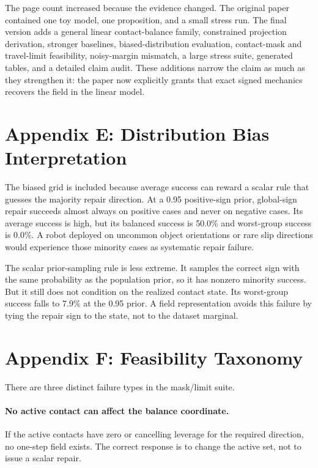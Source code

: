 \documentclass{article}
\begin{document}
The page count increased because the evidence changed. The original paper contained one toy model, one proposition, and a small stress run. The final version adds a general linear contact-balance family, constrained projection derivation, stronger baselines, biased-distribution evaluation, contact-mask and travel-limit feasibility, noisy-margin mismatch, a large stress suite, generated tables, and a detailed claim audit. These additions narrow the claim as much as they strengthen it: the paper now explicitly grants that exact signed mechanics recovers the field in the linear model.

\section{Appendix E: Distribution Bias Interpretation}

The biased grid is included because average success can reward a scalar rule that guesses the majority repair direction. At a 0.95 positive-sign prior, global-sign repair succeeds almost always on positive cases and never on negative cases. Its average success is high, but its balanced success is 50.0\% and worst-group success is 0.0\%. A robot deployed on uncommon object orientations or rare slip directions would experience those minority cases as systematic repair failure.

The scalar prior-sampling rule is less extreme. It samples the correct sign with the same probability as the population prior, so it has nonzero minority success. But it still does not condition on the realized contact state. Its worst-group success falls to 7.9\% at the 0.95 prior. A field representation avoids this failure by tying the repair sign to the state, not to the dataset marginal.

\section{Appendix F: Feasibility Taxonomy}

There are three distinct failure types in the mask/limit suite.

\paragraph{No active contact can affect the balance coordinate.}
If the active contacts have zero or cancelling leverage for the required direction, no one-step field exists. The correct response is to change the active set, not to issue a scalar repair.
\end{document}
